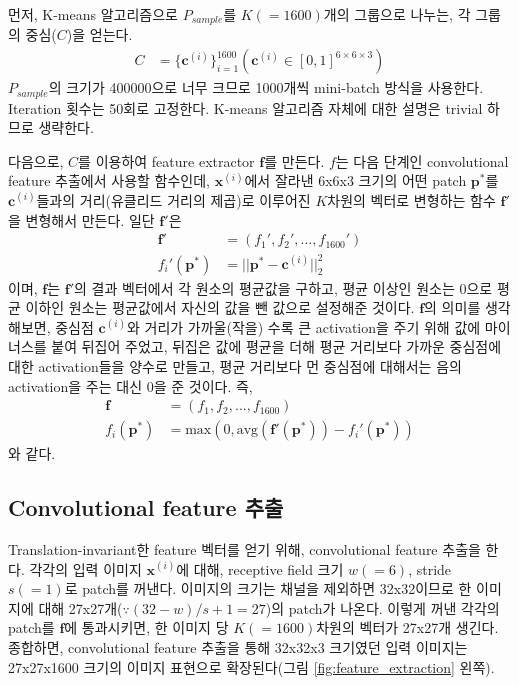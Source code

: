 \documentclass[a4paper,9pt]{article}
\begin{document}
\begin{multicols}{2}
먼저, K-means 알고리즘으로 $P_{sample}$를 $K(=1600)$개의 그룹으로 나누는, 각 그룹의 중심($C$)을 얻는다.
\begin{align*}
    C &= \{ \mathbf{c}^{(i)} \}_{i=1}^{1600} ( \mathbf{c}^{(i)} \in [0, 1]^{6 \times 6 \times 3} )
\end{align*}
$P_{sample}$의 크기가 400000으로 너무 크므로 1000개씩 mini-batch 방식을 사용한다.
Iteration 횟수는 50회로 고정한다.
K-means 알고리즘 자체에 대한 설명은 trivial 하므로 생략한다.

다음으로, $C$를 이용하여 feature extractor $\mathbf{f}$를 만든다.
$f$는 다음 단계인 convolutional feature 추출에서 사용할 함수인데, $\mathbf{x}^{(i)}$에서 잘라낸 6x6x3 크기의 어떤 patch $\mathbf{p}^{*}$를 $\mathbf{c}^{(i)}$들과의 거리(유클리드 거리의 제곱)로 이루어진 $K$차원의 벡터로 변형하는 함수 $\mathbf{f}'$을 변형해서 만든다.
일단 $\mathbf{f}'$은
\begin{align*}
    \mathbf{f}' &= (f_{1}', f_{2}', ..., f_{1600}') \\
    f_{i}'(\mathbf{p}^{*}) &= || \mathbf{p}^{*} - \mathbf{c}^{(i)} ||_2^2
\end{align*}
이며, $\mathbf{f}$는 $\mathbf{f}'$의 결과 벡터에서 각 원소의 평균값을 구하고, 평균 이상인 원소는 0으로 평균 이하인 원소는 평균값에서 자신의 값을 뺀 값으로 설정해준 것이다.
$\mathbf{f}$의 의미를 생각해보면, 중심점 $\mathbf{c}^{(i)}$와 거리가 가까울(작을) 수록 큰 activation을 주기 위해 값에 마이너스를 붙여 뒤집어 주었고, 뒤집은 값에 평균을 더해 평균 거리보다 가까운 중심점에 대한 activation들을 양수로 만들고, 평균 거리보다 먼 중심점에 대해서는 음의 activation을 주는 대신 0을 준 것이다.
즉,
\begin{align*}
    \mathbf{f} &= (f_{1}, f_{2}, ..., f_{1600}) \\
    f_{i}(\mathbf{p}^{*}) &= \text{max} ( 0, \text{avg} (\mathbf{f}'(\mathbf{p}^{*})) - f_{i}'(\mathbf{p}^{*}) )
\end{align*}
와 같다.

\subsection{Convolutional feature 추출}

Translation-invariant한 feature 벡터를 얻기 위해, convolutional feature 추출을 한다.
각각의 입력 이미지 $\mathbf{x}^{(i)}$에 대해, receptive field 크기 $w(=6)$, stride $s(=1)$로 patch를 꺼낸다.
이미지의 크기는 채널을 제외하면 32x32이므로 한 이미지에 대해 27x27개($\because (32-w)/s+1=27$)의 patch가 나온다.
이렇게 꺼낸 각각의 patch를 $\mathbf{f}$에 통과시키면, 한 이미지 당 $K(=1600)$차원의 벡터가 27x27개 생긴다.
종합하면, convolutional feature 추출을 통해 32x32x3 크기였던 입력 이미지는 27x27x1600 크기의 이미지 표현으로 확장된다(그림 \ref{fig:feature_extraction} 왼쪽).


\end{multicols}
\end{document}
